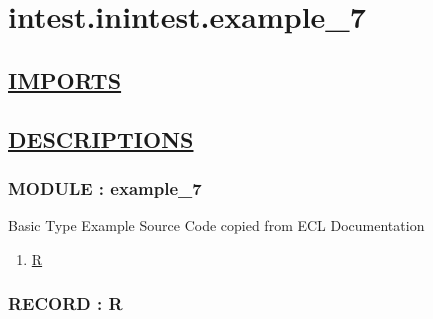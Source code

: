 \chapter*{intest.inintest.example\_7}

\section*{\underline{IMPORTS}}

\section*{\underline{DESCRIPTIONS}}
\subsection*{MODULE : example\_7}
\hypertarget{ecldoc:intest.inintest.example_7_intest.inintest.example_7}{}
Basic Type Example Source Code copied from ECL Documentation \\
\begin{enumerate}
\item \hyperlink{ecldoc:intest.inintest.example_7_intest.inintest.example_7.r}{R}
\end{enumerate}
\subsection*{RECORD : R}
\hypertarget{ecldoc:intest.inintest.example_7_intest.inintest.example_7.r}{}

